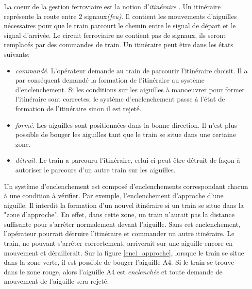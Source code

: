 La coeur de la gestion
  ferroviaire est la notion d'\emph{itinéraire} \cite{siteferro}. Un itinéraire
  représente la route entre 2 signaux\emph{(feu)}. Il contient les mouvements
  d'aiguilles nécessaires pour que le train parcourt le chemin entre le
  signal de départ et le signal d'arrivée. Le circuit ferroviaire ne
  contient pas de signaux, ils seront remplacés par des commandes de
  train. Un itinéraire peut être dans les états suivants:
  \begin{itemize}
    \item \emph{commandé}. L'opérateur demande au train de parcourir
      l'itinéraire choisit. Il a par conséquent demandé la formation de
      l'itinéraire au système d'enclenchement. Si les conditions sur
      les aiguilles à manoeuvrer pour former l'itinéraire sont
      correctes, le système d'enclenchement passe à l'état de formation de
      l'itinéraire sinon il est rejeté.
    \item \emph{formé}. Les aiguilles sont positionnées dans la bonne
      direction. Il n'est plus possible de bouger les aiguilles tant
      que le train se situe dans une certaine zone.
    \item \emph{détruit}. Le train a parcouru l'itinéraire, celui-ci peut
      être détruit de façon à autoriser le parcours d'un autre train sur les
      aiguilles.  
  \end{itemize}


\item []
\item []
\item []
  
Un système d'enclenchement est composé d'enclenchements correspondant
chacun à une condition à vérifier. Par exemple, l'{enclenchement
d'approche d'une aiguille}; Il interdit la formation d'un 
nouvel itinéraire si un train se situe dans la "zone d'approche".
En effet, dans cette zone, un train
n'aurait pas la distance suffisante pour s'arrêter normalement devant
l'aiguille.  Sans cet enclenchement, l'opérateur pourrait détruire
l'itinéraire et commander un autre itinéraire. Le train, ne pouvant
s'arrêter correctement, arriverait sur une aiguille encore en
mouvement et déraillerait.
Sur la figure \ref{encl_approche}, lorsque le train se situe dans la
zone verte, il est possible de bouger l'aiguille A4. Si le train se
trouve dans le zone rouge, alors l'aiguille A4 est \emph{enclenchée}
et toute demande de mouvement de l'aiguille sera rejeté.


